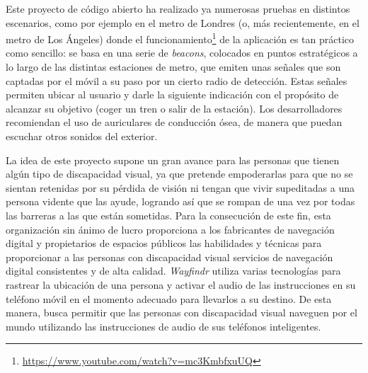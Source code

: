 Este proyecto de código abierto ha realizado ya numerosas pruebas en distintos escenarios, como por ejemplo en el metro de Londres (o, más recientemente, en el metro de Los Ángeles) donde el funcionamiento\footnote{\url{https://www.youtube.com/watch?v=mc3KmbfxuUQ}} de la aplicación es tan práctico como sencillo: se basa en una serie de \textit{beacons}, colocados en puntos estratégicos a lo largo de las distintas estaciones de metro, que emiten unas señales que son captadas por el móvil a su paso por un cierto radio de detección. Estas señales permiten ubicar al usuario y darle la siguiente indicación con el propósito de alcanzar su objetivo (coger un tren o salir de la estación). Los desarrolladores recomiendan el uso de auriculares de conducción ósea, de manera que puedan escuchar otros sonidos del exterior.

La idea de este proyecto supone un gran avance para las personas que tienen algún tipo de discapacidad visual, ya que pretende empoderarlas para que no se sientan retenidas por su pérdida de visión ni tengan que vivir supeditadas a una persona vidente que las ayude, logrando así que se rompan de una vez por todas las barreras a las que están sometidas. Para la consecución de este fin, esta organización sin ánimo de lucro proporciona a los fabricantes de navegación digital y propietarios de espacios públicos las habilidades y técnicas para proporcionar a las personas con discapacidad visual servicios de navegación digital consistentes y de alta calidad. \textit{Wayfindr} utiliza varias tecnologías para rastrear la ubicación de una persona y activar el audio de las instrucciones en su teléfono móvil en el momento adecuado para llevarlos a su destino. De esta manera, busca permitir que las personas con discapacidad visual naveguen por el mundo utilizando las instrucciones de audio de sus teléfonos inteligentes.


